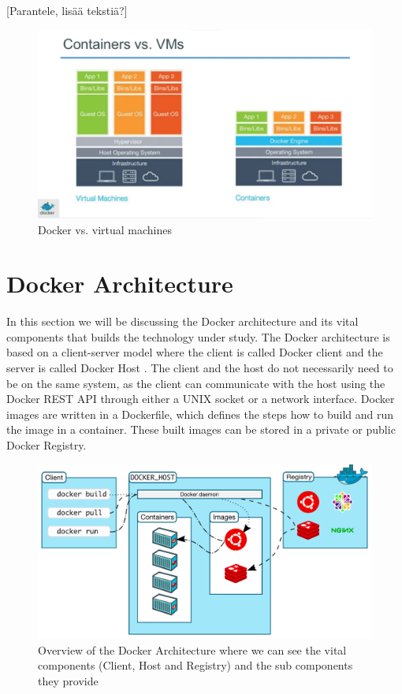 \documentclass[fleqn,12pt]{olplainarticle}
\begin{document}
[Parantele, lisää tekstiä?]

\begin{figure}[h]
    \centering
    \includegraphics[width=1\textwidth]{docker_vs_vm.png}
    \caption{Docker vs. virtual machines \cite{docker:vs_vm}}
    \label{fig:overview}
\end{figure}

\section{Docker Architecture}

In this section we will be discussing the Docker architecture and its vital components that builds the technology under study. The Docker architecture is based on a client-server model where the client is called Docker client and the server is called Docker Host \citep{docker:overview, aquasec:docker_architecture}. The client and the host do not necessarily need to be on the same system, as the client can communicate with the host using the Docker REST API through either a UNIX socket or a network interface. Docker images are written in a Dockerfile, which defines the steps how to build and run the image in a container. These built images can be stored in a private or public Docker Registry.

\begin{figure}[h]
    \centering
    \includegraphics[width=1\textwidth]{docker-overview}
    \caption{Overview of the Docker Architecture where we can see the vital components (Client, Host and Registry) and the sub components they provide \citep{docker:overview}}
    \label{fig:overview}
\end{figure}
\end{document}
